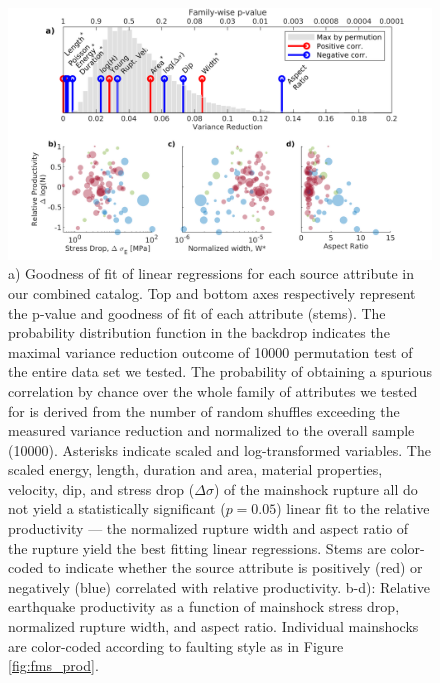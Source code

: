 \documentclass[draft]{agujournal}
\begin{document}
\begin{figure}
\centering
\includegraphics{figures/stem_plot_mw5.png}
\caption{a) Goodness of fit of linear regressions for each source attribute in our combined catalog. Top and bottom axes respectively represent the p-value and goodness of fit of each attribute (stems). The probability distribution function in the backdrop indicates the maximal variance reduction outcome of 10000 permutation test of the entire data set we tested. The probability of obtaining a spurious correlation by chance over the whole family of attributes we tested for is derived from the number of random shuffles exceeding the measured variance reduction and normalized to the overall sample (10000). Asterisks indicate scaled and log-transformed variables. The scaled energy, length, duration and area, material properties, velocity, dip, and stress drop ($\Delta\sigma$) of the mainshock rupture all do not yield a statistically significant ($p=0.05$) linear fit to the relative productivity — the normalized rupture width and aspect ratio of the rupture yield the best fitting linear regressions. Stems are color-coded to indicate whether the source attribute is positively (red) or negatively (blue) correlated with relative productivity. b-d): Relative earthquake productivity as a function of mainshock stress drop, normalized rupture width, and aspect ratio. Individual mainshocks are color-coded according to faulting style as in Figure \ref{fig:fms_prod}.}
\label{fig:r2_finite_fault}
\end{figure}
\end{document}
